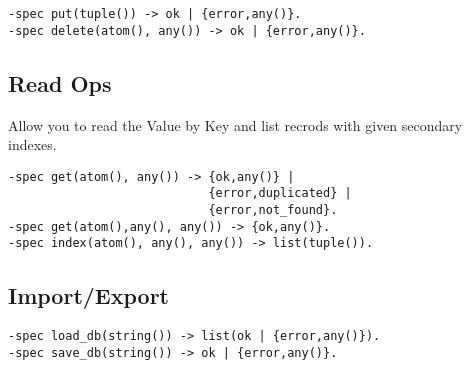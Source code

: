 \vspace{1\baselineskip}
\begin{lstlisting}
-spec put(tuple()) -> ok | {error,any()}.
-spec delete(atom(), any()) -> ok | {error,any()}.
\end{lstlisting}
\vspace{1\baselineskip}

\subsection{Read Ops}
Allow you to read the Value by Key and list
recrods with given secondary indexes.

\vspace{1\baselineskip}
\begin{lstlisting}
-spec get(atom(), any()) -> {ok,any()} | 
                            {error,duplicated} |
                            {error,not_found}.
-spec get(atom(),any(), any()) -> {ok,any()}.
-spec index(atom(), any(), any()) -> list(tuple()).
\end{lstlisting}
\vspace{1\baselineskip}

\subsection{Import/Export}

\vspace{1\baselineskip}
\begin{lstlisting}
-spec load_db(string()) -> list(ok | {error,any()}).
-spec save_db(string()) -> ok | {error,any()}.
\end{lstlisting}
\vspace{1\baselineskip}
